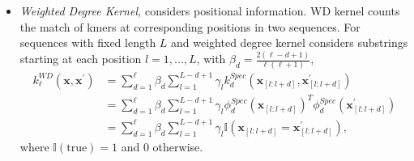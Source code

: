 \begin{itemize}
    \item \textit{Weighted Degree Kernel,} considers positional information. WD kernel counts the match of kmers at corresponding positions in two sequences.
    For sequences with fixed length $L$ and weighted degree kernel considers substrings starting at each position $l = 1, ..., L$, with $\beta_d = \frac{2(\ell - d + 1)}{\ell(\ell+1)}$, \\
    \begin{align}
        k_\ell^{WD}(\mathbf{x}, \mathbf{x}^\prime) 
        &= \sum_{d=1}^{\ell} \beta_d \sum_{l=1}^{L-d+1} \gamma_l k_d^{Spec}(\mathbf{x}_{[l:l+d]}, \mathbf{x}_{[l:l+d]}^\prime)\\
        &= \sum_{d=1}^{\ell} \beta_d \sum_{l=1}^{L-d+1} \gamma_l \phi_d^{Spec}(\mathbf{x}_{[l:l+d]})^T \phi_d^{Spec}(\mathbf{x}_{[l:l+d]}^\prime)\\
        &= \sum_{d=1}^{\ell} \beta_d \sum_{l=1}^{L-d+1} \gamma_l \mathbb{I}(\mathbf{x}_{[l:l+d]} = \mathbf{x}_{[l:l+d]}^\prime),
    \end{align}
    where $\mathbb{I}(\text{true}) = 1$ and 0 otherwise. 
    
\end{itemize}

